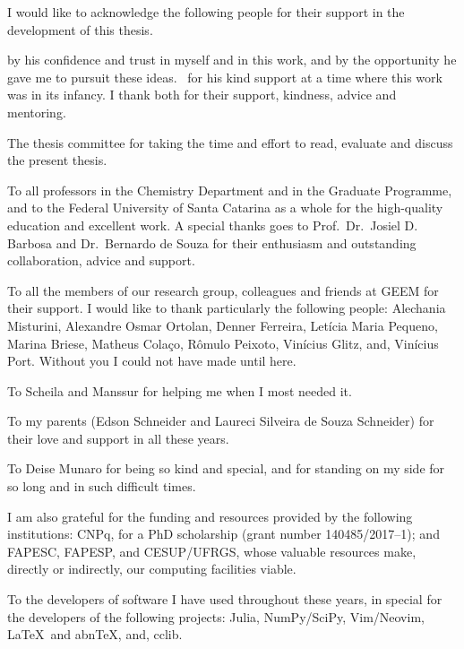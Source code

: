 \begin{agradecimentos}[Acknowledgements]
I would like to acknowledge the following people for their support in the
development of this thesis.

\imprimirorientador{} by his confidence and trust in myself and in this work, and by the
opportunity he gave me to pursuit these ideas.
\imprimircoorientador\ for his kind support at a time where this work was in its
infancy.
I thank both for their support, kindness, advice and mentoring.

The thesis committee for taking the time and effort to read, evaluate and
discuss the present thesis.

To all professors in the Chemistry Department and in the Graduate Programme, and to the Federal University of
Santa Catarina as a whole
for the high-quality education and excellent work.
A special thanks goes to Prof.\ Dr.\ Josiel D. Barbosa and
Dr.\ Bernardo de Souza
for their enthusiasm and outstanding collaboration, advice and support.

To all the members of our research group, colleagues and friends at GEEM for
their support.
I would like to thank particularly the following people:
Alechania Misturini,
Alexandre Osmar Ortolan,
Denner Ferreira,
Letícia Maria Pequeno,
Marina Briese,
Matheus Colaço,
Rômulo Peixoto,
Vinícius Glitz,
and,
Vinícius Port.
Without you I could not have made until here.

To Scheila and Manssur for helping me when I most needed it.

To my parents (Edson Schneider and Laureci Silveira de Souza Schneider)
for their love and support in all these years.

To Deise Munaro for being so kind and special,
and for standing on my side for so long and in such difficult times.

I am also grateful for the funding and resources provided by the following institutions:
CNPq, for a PhD scholarship (grant number 140485/2017--1);
and FAPESC, FAPESP, and CESUP/UFRGS, whose valuable resources make, directly or
indirectly, our computing facilities
viable.

To the developers of software I have used throughout these years, in special for
the developers of the following projects:
Julia,
NumPy/SciPy,
Vim/Neovim,
\LaTeX\ and abn\TeX{},
and,
cclib.

\end{agradecimentos}
